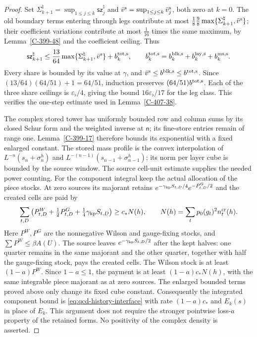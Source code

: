 \documentclass[11pt,letterpaper,reqno]{amsart}
\theoremstyle{definition}
\theoremstyle{remark}
\begin{document}
\begin{proof}
Set $\Sigma_{k+1}^\natural=\sup_{1\le j\le k}
\mathsf{sz}_j^\natural$ and
$\bar v^{\rm s}=\sup_{1\le j\le k}\bar v_j^{\rm s}$, both
zero at $k=0$. The old boundary terms entering through legs
contribute at most $\frac18\frac98
\max\{\Sigma_{k+1}^\natural,\bar v^{\rm s}\}$; their
coefficient variations contribute at most $\frac1{16}$ times
the same maximum, by Lemma~\ref{C-399-48} and the coefficient
ceiling. Thus
\[
 \mathsf{sz}_{k+1}^\natural
 \le\frac{13}{64}\max\{\Sigma_{k+1}^\natural,\bar v^{\rm s}\}
       +b_k^{\rm tot,s},\qquad
 b_k^{\rm tot,s}=b_k^{\rm blk,s}+b_k^{\rm lay,s}+b_k^{\rm ms,s}.
\]
Every share is bounded by its value at $\gamma$, and
$\bar v^{\rm s}\le b^{\rm blk,s}\le b^{\rm tot,s}$.
Since $(13/64)(64/51)+1=64/51$, induction preserves
$(64/51)b^{\rm tot,s}$. Each of the three share ceilings is
$\varepsilon_\flat/4$, giving the bound
$16\varepsilon_\flat/17$ for the leg class. This verifies
the one-step estimate used in Lemma~\ref{C-407-38}.

The complex stored tower has uniformly bounded row and
column sums by its closed Schur form and the weighted
inverse at $\mathsf n$; its fine-store entries remain
of range one. Lemma~\ref{C-399-17} therefore bounds its
exponential with a fixed enlarged constant. The stored
mass profile is the convex interpolation of
$L^{-n}(s_n+\sigma_n^h)$ and
$L^{-(n-1)}(s_{n-1}+\sigma_{n-1}^h)$; its norm per
layer cube is bounded by the source window. The source
cell-unit estimate supplies the needed power counting.
For the component integral keep the actual allocation of the
piece stocks. At zero sources its majorant retains
$e^{-\gamma_{\rm kp}S_{t,D}/4}e^{-P^G_{t,D}/2}$ and
the created cells are paid by
\[
 \sum_{t,D}\left(P^W_{t,D}+\tfrac12P^G_{t,D}
                      +\tfrac14\gamma_{\rm kp}S_{t,D}\right)
       \ge c_*N(h),\qquad
 N(h)=\sum_t p_0(g_t)^2 n_t^{\rm cr}(h).
\]
Here $P^W,P^G$ are the nonnegative Wilson and gauge-fixing
stocks, and $\sum P^W\le\beta A(U)$. The source leaves
$e^{-\gamma_{\rm kp}S_{t,D}/2}$ after the kept halves:
one quarter remains in the same majorant and the other
quarter, together with half the gauge-fixing stock, pays
the created cells. The Wilson stock is at least
$(1-a)P^W$. Since $1-a\le1$, the payment is at least
$(1-a)c_*N(h)$, with the same integrable piece majorant
as at zero sources. The enlarged bounded terms proved
above only change its fixed cube constant. Consequently
the integrated component bound is
\eqref{eq:qcd-history-interface} with rate $(1-a)c_*$
and $E_k(s)$ in place of $E_k$. This argument does not
require the stronger pointwise loss-$a$ property of
the retained forms. No positivity of the complex density
is asserted.


\end{proof}
\end{document}

